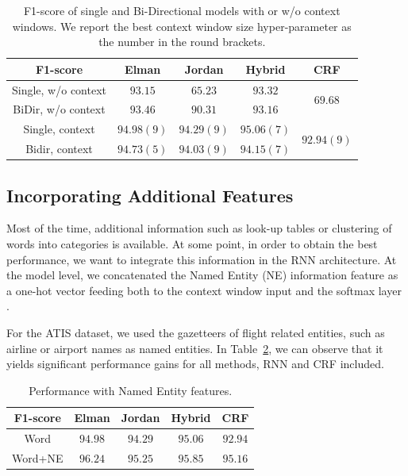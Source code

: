 \begin{table}
\centering
\begin{tabular}{|c|c|c|c|c|}
\hline
F1-score &   Elman &  Jordan &  Hybrid & CRF \\
\hline
Single, w/o context &  $93.15$  & $65.23$  &  $93.32$ & \multirow{2}{*}{$69.68$} \\
BiDir, w/o context &  $93.46$ &   $90.31$  &  $93.16$  & \\ 
\hline
Single, context &  $94.98 (9)$ &  $94.29 (9)$ &   $95.06 (7)$ &    \multirow{2}{*}{$92.94 (9)$} \\
Bidir, context &  $94.73 (5)$ &  $94.03 (9)$ &  $94.15 (7)$ & \\
\hline   
\end{tabular}

\caption[F1-score of Single and Bi-Directionnal models]{F1-score of single and Bi-Directional models with or w/o context
windows. We report the best context window size hyper-parameter as the number
in the round brackets.}
\label{tab:bidir}
\end{table}

\subsection{Incorporating Additional Features}

Most of the time, additional information such as look-up tables or clustering
of words into categories is available. At some point, in order to obtain the
best performance, we want to integrate this information in the RNN
architecture. At the model level, we concatenated the Named Entity (NE)
information feature as a one-hot vector feeding both to the context window
input and the softmax layer \citep{rnn49}. 

For the ATIS dataset, we used the gazetteers of flight related entities, such
as airline or airport names as named entities. In Table~\ref{tab:ne}, we can observe that
it yields significant performance gains for all methods, RNN and CRF included.

\begin{table}
\centering
\begin{tabular}{|c|c|c|c|c|}
\hline
F1-score &   Elman &  Jordan &  Hybrid & CRF \\
\hline
Word    & $94.98$ &  $94.29$ &  $95.06$ &  $92.94$ \\
Word+NE & $96.24$ &  $95.25$ &  $95.85$ &  $95.16$ \\
\hline
\end{tabular}
\caption[F1-score Named Entity features]{Performance with Named Entity features.}
\label{tab:ne}
\end{table}


